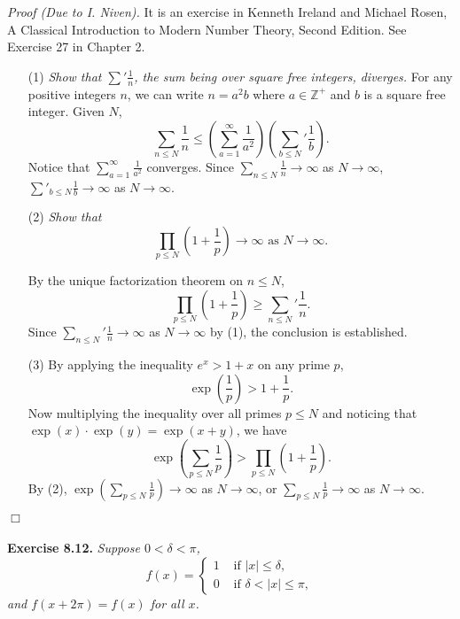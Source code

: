\documentclass{article}
\begin{document}
\emph{Proof (Due to I. Niven).}
It is an exercise in Kenneth Ireland and Michael Rosen,
A Classical Introduction to Modern Number Theory, Second Edition. See Exercise 27 in Chapter 2.

\begin{enumerate}
\item[(1)]
\emph{Show that ${\sum}' \frac{1}{n}$, the sum being over square free integers, diverges.}
For any positive integers $n$, we can write $n = a^2 b$ where $a \in \mathbb{Z}^+$ and
$b$ is a square free integer.
Given $N$,
$$\sum_{n \leq N} \frac{1}{n}
\leq \left(\sum_{a = 1}^{\infty} \frac{1}{a^2} \right)
\left( {\sum_{b \leq N}}' \frac{1}{b} \right).$$
Notice that $\sum_{a = 1}^{\infty} \frac{1}{a^2}$ converges.
Since $\sum_{n \leq N} \frac{1}{n} \rightarrow \infty$ as $N \rightarrow \infty$,
$\sum'_{b \leq N}\frac{1}{b} \rightarrow \infty$ as $N \rightarrow \infty$.

\item[(2)]
\emph{Show that
\[
  \prod_{p \leq N} ( 1 + \frac{1}{p} ) \rightarrow \infty \text{ as } N \rightarrow \infty.
\]}

By the unique factorization theorem on $n \leq N$,
$$\prod_{p \leq N} \left( 1 + \frac{1}{p} \right)
\geq {\sum_{n \leq N}}' \frac{1}{n}.$$
Since ${\sum_{n \leq N}}' \frac{1}{n} \rightarrow \infty$ as $N \rightarrow \infty$ by (1),
the conclusion is established.

\item[(3)]
By applying the inequality $e^x > 1 + x$ on any prime $p$,
$$\exp\left(\frac{1}{p}\right) > 1 + \frac{1}{p}.$$
Now multiplying the inequality over all primes $p \leq N$ and noticing that
$\exp(x) \cdot \exp(y) = \exp(x + y)$, we have
$$\exp\left(\sum_{p \leq N} \frac{1}{p} \right)
> \prod_{p \leq N} \left( 1 + \frac{1}{p} \right).$$
By (2),
$\exp\left(\sum_{p \leq N} \frac{1}{p} \right) \rightarrow \infty$ as $N \rightarrow \infty$, or
$\sum_{p \leq N} \frac{1}{p} \rightarrow \infty$ as $N \rightarrow \infty$.
\end{enumerate}
$\Box$ \\\\






\textbf{Exercise 8.12.}
\emph{Suppose $0 < \delta < \pi$,
\begin{equation*}
  f(x) =
    \begin{cases}
      1 & \text{ if } |x| \leq \delta, \\
      0 & \text{ if } \delta < |x| \leq \pi,
    \end{cases}
\end{equation*}
and $f(x + 2\pi) = f(x)$ for all $x$.}
\end{document}
